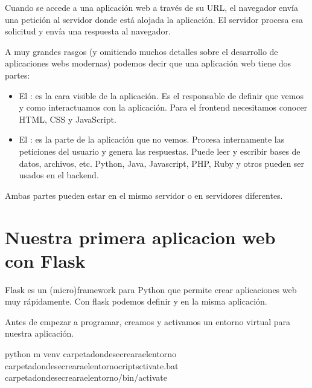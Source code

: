 \documentclass[a5paper,9pt,spanish]{sphinxmanual}
\begin{document}
\sphinxAtStartPar
Cuando se accede a una aplicación web a través de su URL, el
navegador envía una petición al servidor donde está alojada la aplicación.
El servidor procesa esa solicitud y envía una respuesta al navegador.

\sphinxAtStartPar
A muy grandes rasgos (y omitiendo muchos detalles sobre el desarrollo
de aplicaciones webs modernas) podemos decir que una aplicación
web tiene dos partes:
\begin{itemize}
\item {} 
\sphinxAtStartPar
El : es la cara visible de la aplicación. Es el responsable
de definir que vemos y como interactuamos con la aplicación.
Para el frontend necesitamos conocer HTML, CSS y JavaScript.

\item {} 
\sphinxAtStartPar
El : es la parte de la aplicación que no vemos. Procesa
internamente las peticiones del usuario y genera las respuestas.
Puede leer y escribir bases de datos, archivos, etc.
Python, Java, Javascript, PHP, Ruby y otros pueden ser usados en el
backend.

\end{itemize}

\sphinxAtStartPar
Ambas partes pueden estar en el mismo servidor o en servidores diferentes.


\section{Nuestra primera aplicacion web con Flask}
\label{\detokenize{flask:nuestra-primera-aplicacion-web-con-flask}}
\sphinxAtStartPar
Flask es un (micro)framework para Python que permite crear aplicaciones
web muy rápidamente.
Con flask podemos definir  y  en la misma aplicación.

\sphinxAtStartPar
Antes de empezar a programar, creamos y activamos un entorno virtual
para nuestra aplicación.

\begin{sphinxVerbatim}[commandchars=\\\{\}]
python \PYGZhy{}m venv \PYGZlt{}carpeta\PYGZus{}donde\PYGZus{}se\PYGZus{}creara\PYGZus{}el\PYGZus{}entorno\PYGZgt{}
\PYGZlt{}carpeta\PYGZus{}donde\PYGZus{}se\PYGZus{}creara\PYGZus{}el\PYGZus{}entorno\PYGZgt{}criptsctivate.bat
 \PYGZlt{}carpeta\PYGZus{}donde\PYGZus{}se\PYGZus{}creara\PYGZus{}el\PYGZus{}entorno\PYGZgt{}/bin/activate
\end{sphinxVerbatim}
\end{document}
